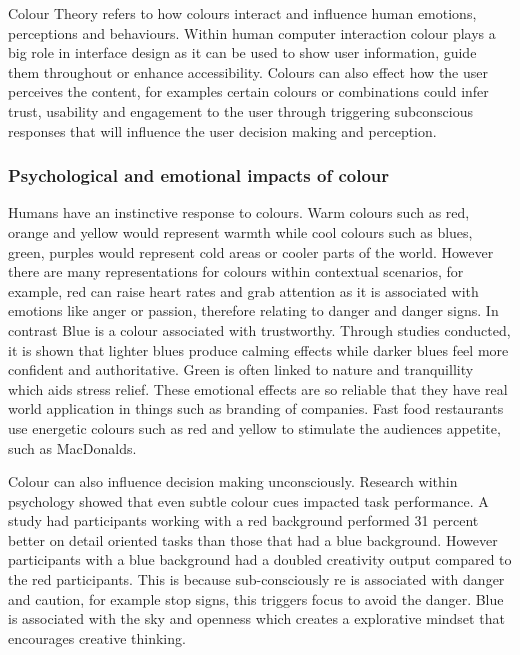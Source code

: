 \documentclass[]{project_final}
\begin{document}
Colour Theory refers to how colours interact and influence human emotions, perceptions and behaviours. Within human computer interaction colour plays a big role in interface design as it can be used to show user information, guide them throughout or enhance accessibility. Colours can also effect how the user perceives the content, for examples certain colours or combinations could infer trust, usability and engagement to the user through triggering subconscious responses that will influence the user decision making and perception.\cite{interaction_what_nodate}

\subsubsection{Psychological and emotional impacts of colour}

Humans have an instinctive response to colours. Warm colours such as red, orange and yellow would represent warmth while cool colours such as blues, green, purples would represent cold areas or cooler parts of the world. However there are many representations for colours within contextual scenarios, for example, red can raise heart rates and grab attention as it is associated with emotions like anger or passion, therefore relating to danger and danger signs. In contrast Blue is a colour associated with trustworthy. Through studies conducted, it is shown that lighter blues produce calming effects while darker blues feel more confident and authoritative. Green is often linked to nature and tranquillity which aids stress relief. These emotional effects are so reliable that they have real world application in things such as branding of companies. Fast food restaurants use energetic colours such as red and yellow to stimulate the audiences appetite, such as MacDonalds.\cite{inbook}

Colour can also influence decision making unconsciously. Research within psychology showed that even subtle colour cues impacted task performance. A study had participants working with a red background performed 31 percent better on detail oriented tasks than those that had a blue background. However participants with a blue background had a doubled creativity output compared to the red participants. This is because sub-consciously re is associated with danger and caution, for example stop signs, this triggers focus to avoid the danger. Blue is associated with the sky and openness which creates a explorative mindset that encourages creative thinking.\cite{elliot_color_2015}
\end{document}
